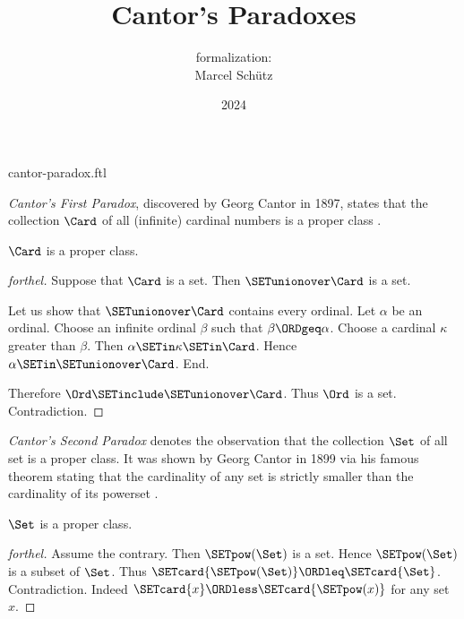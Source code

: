 \documentclass{article}
\title{Cantor's Paradoxes}
\author{\Naproche formalization: \\[0.5em]Marcel Schütz}
\date{2024}
\begin{document}
\begin{smodule}{cantor-paradox.ftl}
\maketitle


\noindent \emph{Cantor's First Paradox}, discovered by Georg Cantor in 1897,
states that the collection $\Card$ of all (infinite) cardinal numbers is a
proper class \cite[chapter 156]{Cantor1991}.

\begin{theorem}[forthel,title=Cantor's First Paradox,id=cantor_paradox_1]
  $\Card$ is a proper class.
\end{theorem}
\begin{proof}[forthel]
  Suppose that $\Card$ is a set.
  Then $\SETunionover \Card$ is a set.

  Let us show that $\SETunionover \Card$ contains every ordinal.
    Let $\alpha$ be an ordinal.
    Choose an infinite ordinal $\beta$ such that $\beta \ORDgeq \alpha$.
    Choose a cardinal $\kappa$ greater than $\beta$.
    Then $\alpha \SETin \kappa \SETin \Card$.
    Hence $\alpha \SETin \SETunionover \Card$.
  End.

  Therefore $\Ord \SETinclude \SETunionover \Card$.
  Thus $\Ord$ is a set.
  Contradiction.
\end{proof}

\emph{Cantor's Second Paradox} denotes the observation that the collection
$\Set$ of all set is a proper class.
It was shown by Georg Cantor in 1899 via his famous theorem stating that the
cardinality of any set is strictly smaller than the cardinality of its 
powerset \cite[chapter 163]{Cantor1991}.

\begin{theorem}[forthel,title=Cantor's Second Paradox,id=cantor_paradox_2]
  $\Set$ is a proper class.
\end{theorem}
\begin{proof}[forthel]
  Assume the contrary.
  Then $\SETpow(\Set)$ is a set.
  Hence $\SETpow(\Set)$ is a subset of $\Set$.
  Thus $\SETcard{\SETpow(\Set)} \ORDleq \SETcard{\Set}$.
  Contradiction.
  Indeed $\SETcard{x} \ORDless \SETcard{\SETpow(x)}$ for any set $x$.
\end{proof}

\printbibliography
{}
\end{smodule}
\end{document}
